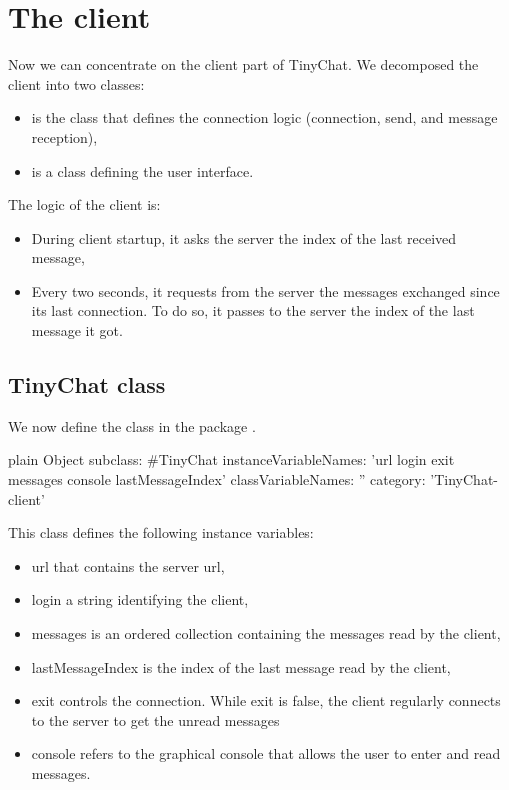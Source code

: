 \documentclass[10pt,twoside,english]{_support/latex/sbabook/sbabook}
\begin{document}
\section{The client }
Now we can concentrate on the client part of TinyChat. We decomposed the client into two classes:

\begin{itemize}
\item {} is the class that defines the connection logic (connection, send, and message reception),
\item {} is a class defining the user interface. 
\end{itemize}

The logic of the client is: 

\begin{itemize}
\item During client startup, it asks the server the index of the last received message, 
\item Every two seconds, it requests from the server the messages exchanged since its last connection. To do so, it passes to the server the index of the last message it got. 
\end{itemize}
\subsection{TinyChat class}
We now define the class  in the package . 

\begin{displaycode}{plain}
Object subclass: #TinyChat
	instanceVariableNames: 'url login exit messages console lastMessageIndex'
	classVariableNames: ''
	category: 'TinyChat-client'
\end{displaycode}

This class defines the following instance variables:

\begin{itemize}
\item url that contains the server url,
\item login a string identifying the client, 
\item messages is an ordered collection containing the messages read by the client, 
\item lastMessageIndex is the index of the last message read by the client, 
\item exit controls the connection. While exit is false, the client regularly connects to the server to get the unread messages
\item console refers to the graphical console that allows the user to enter and read messages. 
\end{itemize}
\end{document}
